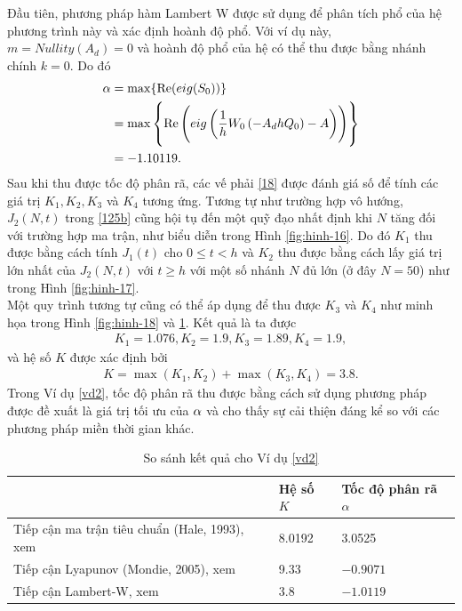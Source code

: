 \begin{vd}
\begin{figure}[h!]
	\label{fig:hinh-19}
\end{figure}
Đầu tiên, phương pháp hàm Lambert W được sử dụng để phân tích phổ của hệ phương trình này và xác định hoành độ phổ. Với ví dụ này, $m = Nullity(A_d) =0$ và hoành độ phổ của hệ có thể thu được bằng nhánh chính $k =0$. Do đó
\begin{align}\label{46}
	\alpha &= \max \{ \mathrm{Re}(eig(S_0))\} \notag\\
	& = \max\left\{\mathrm{Re} \left(eig \left(\dfrac{1}{h} W_0\left( -A_dhQ_0\right) - A\right) \right) \right\}	\notag \\
	& = -1.10119.	
\end{align}
Sau khi thu được tốc độ phân rã, các vế phải \eqref{18} được đánh giá số để tính các giá trị $K_1, K_2, K_3$ và $K_4$ tương ứng.
Tương tự như trường hợp vô hướng, $J_2(N,t)$ trong \eqref{125b} cũng hội tụ  đến một quỹ đạo nhất định khi $N$ tăng đối với trường hợp ma trận, như biểu diễn trong Hình \ref{fig:hinh-16}. Do đó $K_1$ thu được bằng cách tính $J_1(t)$ cho $0 \le t<h$ và $K_2$ thu được bằng cách lấy giá trị lớn nhất của $J_2(N,t)$ với $t \ge h$ với một số nhánh $N$ đủ lớn (ở đây $N = 50$) như trong Hình \ref{fig:hinh-17}.\\
Một quy trình tương tự cũng có thể áp dụng để thu được $K_3$ và $K_4$ như minh họa trong Hình \ref{fig:hinh-18} và \ref{fig:hinh-19}. Kết quả là ta được
\begin{align*}
	K_1 = 1.076, K_2 = 1.9, K_3 = 1.89, K_4 = 1.9,
\end{align*}
và hệ số $K$ được xác định bởi 
\begin{align*}
	K = \max(K_1, K_2) + \max(K_3, K_4) = 3.8.
\end{align*}
%
Trong Ví dụ \ref{vd2}, tốc độ phân rã thu được bằng cách sử dụng phương pháp được đề xuất là giá trị tối ưu của $\alpha$ và cho thấy sự cải thiện đáng kể so với các phương pháp miền thời gian khác.
	\begin{table}[!h]
		\centering
		\begin{tabular}{lll}
			\hline 
			& Hệ số $K$ & Tốc độ phân rã $\alpha$ \\ 
			\hline 
			Tiếp cận ma trận tiêu chuẩn (Hale, 1993), xem \cite{Hal93} & 8.0192 & 3.0525 \\ 
			
			Tiếp cận Lyapunov (Mondie, 2005), xem \cite{Mon05} & 9.33 & $-0.9071$ \\ 
			
			Tiếp cận Lambert-W, xem \cite{Dua12} & $3.8$ & $-1.0119$ \\ 
			\hline 
		\end{tabular} 
		\caption{So sánh kết quả cho Ví dụ \ref{vd2}}
		 \label{bang 2}
	\end{table}
   

\end{vd}
